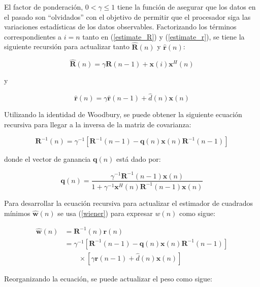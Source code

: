 El factor de ponderación, $0 < \gamma \leq 1$ tiene la función de asegurar que los datos en el pasado son ``olvidados'' con el objetivo de permitir que el procesador siga las variaciones estadísticas de los datos observables. Factorizando los términos correspondientes a $i = n$ tanto en (\ref{estimate_R}) y (\ref{estimate_r}), se tiene la siguiente recursión para actualizar tanto $\mathbf{\hat{R}}(n)$ y $\mathbf{\hat{r}}(n)$:

\begin{equation}
\mathbf{\hat{R}}(n) = \gamma \mathbf{R}(n-1) + \mathbf{x}(i) \mathbf{x}^H(n)
\end{equation}

y

\begin{equation}
\mathbf{\hat{r}}(n) = \gamma \mathbf{\hat{r}}(n-1) + \hat{d}(n) \mathbf{x}(n)
\end{equation}

Utilizando la identidad de Woodbury, se puede obtener la siguiente ecuación recursiva para llegar a la inversa de la matriz de covarianza:

\begin{equation}
\mathbf{R}^{-1}(n) = \gamma^{-1} [\mathbf{R}^{-1}(n-1) - \mathbf{q}(n) \mathbf{x}(n) \mathbf{R}^{-1}(n-1) ] 
\end{equation}

donde el vector de ganancia $\mathbf{q}(n)$ está dado por:

\begin{equation}
\mathbf{q}(n) = \frac{\gamma^{-1} \mathbf{R}^{-1}(n-1) \mathbf{x}(n)}{1 + \gamma^{-1} \mathbf{x}^H(n) \mathbf{R}^{-1}(n-1) \mathbf{x}(n)}
\end{equation}

Para desarrollar la ecuación recursiva para actualizar el estimador de cuadrados mínimos $\mathbf{\hat{w}}(n)$ se usa (\ref{wiener}) para expresar $w(n)$ como sigue:

\begin{align}
\mathbf{\hat{w}}(n) &= \mathbf{R}^{-1}(n) \mathbf{r}(n) \\
                    &= \gamma^{-1} [ \mathbf{R}^{-1}(n-1) - \mathbf{q}(n)\mathbf{x}(n) \mathbf{R}^{-1}(n-1)] \nonumber \\
                    &\qquad \times [\gamma \mathbf{r}(n-1) + \hat{d}(n) \mathbf{x}(n)]
                    \nonumber
\end{align}

Reorganizando la ecuación, se puede actualizar el peso como sigue:

